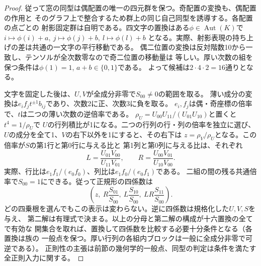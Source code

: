 \begin{proof}
従って窓の同型は偶配置の唯一の四元群を保つ。奇配置の変換も、偶配置の作用と
そのグラフ上で整合するため群上の同じ自己同型を誘導する。各配置の点ごとの
射影固定群は自明である。四文字の置換はある$\phi\in\operatorname{Aut}(K)$で
$ i\mapsto\phi(i)+a,\ j\mapsto\phi(j)+b,\ l\mapsto\phi(l)+b$
となる。実際、射影表現の持ち上げの差は共通の一文字の平行移動である。
偶二位置の変換は反対階数10から一致し、テンソルが全次数零なので奇二位置の移動量は
等しい。厚い次数の組を保つ条件は$\phi(1)=1$, $a+b\in\{0,1\}$である。
よって候補は$2\cdot4\cdot2=16$通りとなる。

文字を固定した後は、$U,V$が全成分非零で$S_{00}\ne0$の範囲を取る。
薄い成分の変換は$e_i f_j t^{\pm1}b_{ij}$であり、次数2に正、次数3に負を取る。
$e_i,f_j$は偶・奇座標の倍率で、$t$は二つの薄い次数の逆倍率である。
$\rho_U=U_{00}U_{11}/(U_{01}U_{10})$と置くと$t^4=1/\rho_U$で
$U$の行列積比が1になる。二つの行列の行・列の倍率を独立に選び、
$U$の成分を全て1、$V$の右下以外を1にすると、その右下は
$z=\rho_V/\rho_U$となる。この倍率が$S$の第1行と第0行に与える比と
第1列と第0列に与える比は、それぞれ
\[
 L=\frac{U_{01}V_{00}}{U_{11}V_{01}},\qquad
 R=\frac{U_{00}V_{01}}{U_{10}V_{00}}.
\]
実際、行比は$e_1 f_1/(e_0 f_0)$、列比は$e_1 f_0/(e_0 f_1)$である。
二組の間の残る共通倍率で$S_{00}=1$にできる。従って正規形の四係数は
\[
 \left(z,\ R\frac{S_{01}}{S_{00}},\ L\frac{S_{10}}{S_{00}},
               \ LR\frac{S_{11}}{S_{00}}\right).
\]
どの四乗根を選んでもこの表示は変わらない。逆に四係数は規格化した$U,V,S$を与え、
第二解は有理式で決まる。以上の分母と第二解の構成が十六置換の全てで有効な
開集合を取れば、置換して四係数を比較する必要十分条件となる（各置換は族の
一般点を保つ。厚い行列の各組内ブロックは一般に全成分非零で可逆である）。
正則性の主張は前節の幾何学的一般点、同型の判定は条件を満たす全正則入力に関する。
\end{proof}
